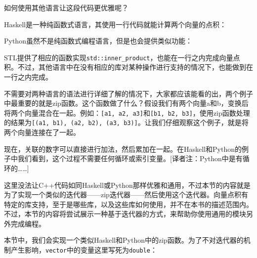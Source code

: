 如何使用其他语言让这段代码更优雅呢？

Haskell是一种纯函数式语言，其使用一行代码就能计算两个向量的点积：


Python虽然不是纯函数式编程语言，但是也会提供类似功能：


STL提供了相应的函数实现\texttt{std::inner\_product}，也能在一行之内完成向量点积。不过，其他语言中在没有相应的库对某种操作进行支持的情况下，也能做到在一行之内完成。

不需要对两种语言的语法进行详细了解的情况下，大家都应该能看的出，两个例子中最重要的就是zip函数。这个函数做了什么？假设我们有两个向量a和b，变换后将两个向量混合在一起。例如：\texttt{[a1, a2, a3]}和\texttt{[b1, b2, b3]}，使用zip函数处理的结果为\texttt{[(a1, b1), (a2, b2), (a3, b3)]}。让我们仔细观察这个例子，就是将两个向量连接在了一起。

现在，关联的数字可以直接进行加法，然后累加在一起。在Haskell和Python的例子中我们看到，这个过程不需要任何循环或索引变量。[译者注：Python中是有循环的……]

这里没法让C++代码如同Haskell或Python那样优雅和通用，不过本节的内容就是为了实现一个类似的迭代器——zip迭代器——然后使用这个迭代器。向量点积有特定的库支持，至于是哪些库，以及这些库如何使用，并不在本书的描述范围内。不过，本节的内容将尝试展示一种基于迭代器的方式，来帮助你使用通用的模块另外完成编程。


本节中，我们会实现一个类似Haskell和Python中的zip函数。为了不对迭代器的机制产生影响，\texttt{vector}中的变量这里写死为\texttt{double}：

